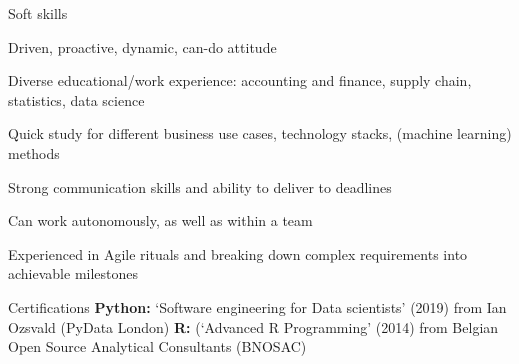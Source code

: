 \begin{cvskills}
    \cvskill
        {Soft skills \hfill}
        {
        \begin{cvitems}
            \item Driven, proactive, dynamic, can-do attitude
            \item Diverse educational/work experience: accounting and finance, supply chain, statistics, data science
            \item Quick study for different business use cases, technology stacks, (machine learning) methods
            \item Strong communication skills and ability to deliver to deadlines
            \item Can work autonomously, as well as within a team
            \item Experienced in Agile rituals and breaking down complex requirements into achievable milestones            
        \end{cvitems}
        }
    \cvskill
        {Certifications \hfill}
        {
        \textbf{Python:} ‘Software engineering for Data scientists’ (2019) from Ian Ozsvald (PyData London) \newline
        \textbf{R:} (‘Advanced R Programming’ (2014) from Belgian Open Source Analytical Consultants (BNOSAC) 
        }
\end{cvskills}
